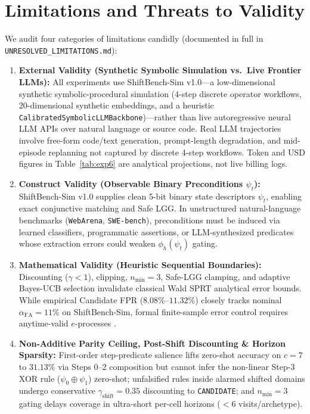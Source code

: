 \documentclass[10pt,letterpaper]{article}
\begin{document}
\section{Limitations and Threats to Validity}
\label{sec:limitations}
We audit four categories of limitations candidly (documented in full in \texttt{UNRESOLVED\_LIMITATIONS.md}):
\begin{enumerate}
  \item \textbf{External Validity (Synthetic Symbolic Simulation vs.\ Live Frontier LLMs):} All experiments use ShiftBench-Sim v1.0—a low-dimensional synthetic symbolic-procedural simulation ($4$-step discrete operator workflows, $20$-dimensional synthetic embeddings, and a heuristic \texttt{CalibratedSymbolicLLMBackbone})—rather than live autoregressive neural LLM APIs over natural language or source code. Real LLM trajectories involve free-form code/text generation, prompt-length degradation, and mid-episode replanning not captured by discrete 4-step workflows. Token and USD figures in Table~\ref{tab:exp6} are analytical projections, not live billing logs.
  \item \textbf{Construct Validity (Observable Binary Preconditions $\psi_t$):} ShiftBench-Sim v1.0 supplies clean 5-bit binary state descriptors $\psi_t$, enabling exact conjunctive matching and Safe LGG. In unstructured natural-language benchmarks (\texttt{WebArena}, \texttt{SWE-bench}), preconditions must be induced via learned classifiers, programmatic assertions, or LLM-synthesized predicates whose extraction errors could weaken $\phi_h(\psi_t)$ gating.
  \item \textbf{Mathematical Validity (Heuristic Sequential Boundaries):} Discounting ($\gamma < 1$), clipping, $n_{\min}=3$, Safe-LGG clamping, and adaptive Bayes-UCB selection invalidate classical Wald SPRT analytical error bounds. While empirical Candidate FPR ($8.08\%\text{--}11.32\%$) closely tracks nominal $\alpha_{\mathrm{FA}}=11\%$ on ShiftBench-Sim, formal finite-sample error control requires anytime-valid $e$-processes \cite{ramdas2023game}.
  \item \textbf{Non-Additive Parity Ceiling, Post-Shift Discounting \& Horizon Sparsity:} First-order step-predicate salience lifts zero-shot accuracy on $c=7$ to $31.13\%$ via Steps 0--2 composition but cannot infer the non-linear Step-3 XOR rule ($\psi_0 \oplus \psi_1$) zero-shot; unfalsified rules inside alarmed shifted domains undergo conservative $\gamma_{\mathrm{shift}}=0.35$ discounting to \texttt{CANDIDATE}; and $n_{\min}=3$ gating delays coverage in ultra-short per-cell horizons ($<6$ visits/archetype).
\end{enumerate}
\end{document}
